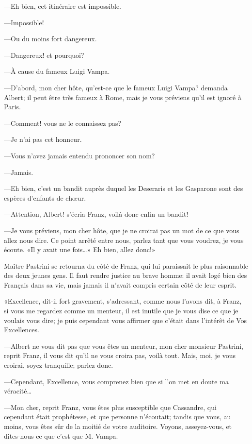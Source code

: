 —Eh bien, cet itinéraire est impossible. 

—Impossible! 

—Ou du moins fort dangereux. 

—Dangereux! et pourquoi? 

—À cause du fameux Luigi Vampa. 

—D'abord, mon cher hôte, qu'est-ce que le fameux Luigi Vampa? demanda Albert; il peut être très fameux à Rome, mais je vous préviens qu'il est ignoré à Paris. 

—Comment! vous ne le connaissez pas? 

—Je n'ai pas cet honneur. 

—Vous n'avez jamais entendu prononcer son nom? 

—Jamais.  

—Eh bien, c'est un bandit auprès duquel les Deseraris et les Gasparone sont des espèces d'enfants de chœur. 

—Attention, Albert! s'écria Franz, voilà donc enfin un bandit! 

—Je vous préviens, mon cher hôte, que je ne croirai pas un mot de ce que vous allez nous dire. Ce point arrêté entre nous, parlez tant que vous voudrez, je vous écoute. «Il y avait une fois\dots» Eh bien, allez donc!» 

Maître Pastrini se retourna du côté de Franz, qui lui paraissait le plus raisonnable des deux jeunes gens. Il faut rendre justice au brave homme: il avait logé bien des Français dans sa vie, mais jamais il n'avait compris certain côté de leur esprit. 

«Excellence, dit-il fort gravement, s'adressant, comme nous l'avons dit, à Franz, si vous me regardez comme un menteur, il est inutile que je vous dise ce que je voulais vous dire; je puis cependant vous affirmer que c'était dans l'intérêt de Vos Excellences. 

—Albert ne vous dit pas que vous êtes un menteur, mon cher monsieur Pastrini, reprit Franz, il vous dit qu'il ne vous croira pas, voilà tout. Mais, moi, je vous croirai, soyez tranquille; parlez donc. 

—Cependant, Excellence, vous comprenez bien que si l'on met en doute ma véracité\dots 

—Mon cher, reprit Franz, vous êtes plus susceptible que Cassandre, qui cependant était prophétesse, et que personne n'écoutait; tandis que vous, au moins, vous êtes sûr de la moitié de votre auditoire. Voyons, asseyez-vous, et dites-nous ce que c'est que M. Vampa. 

